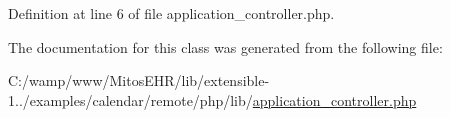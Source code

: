 \-Definition at line 6 of file application\-\_\-controller.\-php.



\-The documentation for this class was generated from the following file\-:\begin{DoxyCompactItemize}
\item 
\-C\-:/wamp/www/\-Mitos\-E\-H\-R/lib/extensible-\/1../examples/calendar/remote/php/lib/\hyperlink{application__controller_8php}{application\-\_\-controller.\-php}\end{DoxyCompactItemize}

